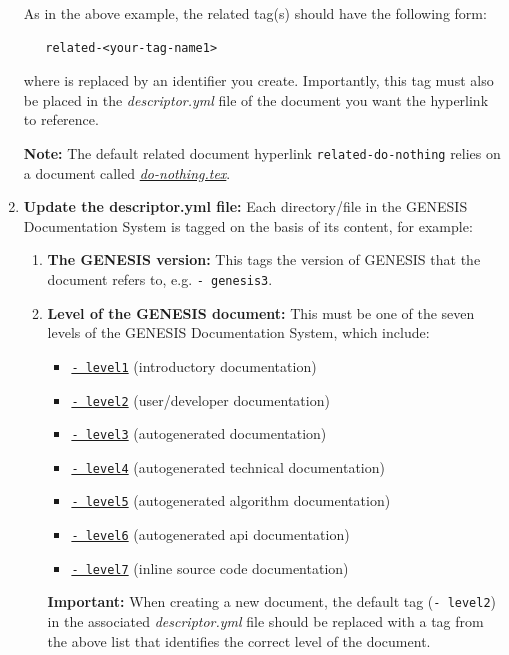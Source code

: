 \documentclass[12pt]{article}
\begin{document}
\begin{enumerate}
As in the above example, the related tag(s) should have the following form:
\begin{verbatim}
   related-<your-tag-name1>
\end{verbatim}
where {\tt <your-tag-name1>} is replaced by an identifier you create. Importantly, this tag must also be placed in the {\it descriptor.yml} file of the document you want the hyperlink to reference.

{\bf Note:} The default related document hyperlink {\tt related-do-nothing} relies on a document called \href{../do-nothing/do-nothing.tex}{\it do-nothing.tex}. 

\item[]{\bf Update the descriptor.yml file:} Each directory/file in the GENESIS Documentation System is tagged on the basis of its content, for example:

   \begin{enumerate}

      \item[]{\bf The GENESIS version:} This tags the version of GENESIS that the document refers to, e.g. {\tt -\,genesis3}.

      \item[]{\bf Level of the GENESIS document:} This must be one of the seven levels of the GENESIS Documentation System, which include:
      
      \begin{itemize}
         \item[]\href{../contents-level1/contents-level1.tex}{\tt -\,level1} (introductory documentation)
         \item[]\href{../contents-level2/contents-level2.tex}{\tt -\,level2} (user/developer documentation)
         \item[]\href{../contents-level3/contents-level3.tex}{\tt -\,level3} (autogenerated documentation)
         \item[]\href{../contents-level4/contents-level4.tex}{\tt -\,level4} (autogenerated technical documentation)
         \item[]\href{../contents-level5/contents-level5.tex}{\tt -\,level5} (autogenerated algorithm documentation)
         \item[]\href{../contents-level6/contents-level6.tex}{\tt -\,level6} (autogenerated api documentation)
         \item[]\href{../contents-level7/contents-level7.tex}{\tt -\,level7} (inline source code documentation)
      \end{itemize}
{\bf Important:} When creating a new document, the default tag ({\tt -\,level2}) in the associated {\it descriptor.yml} file should be replaced with a tag from the above list that identifies the correct level of the document.


\end{enumerate}
\end{enumerate}
\end{document}
